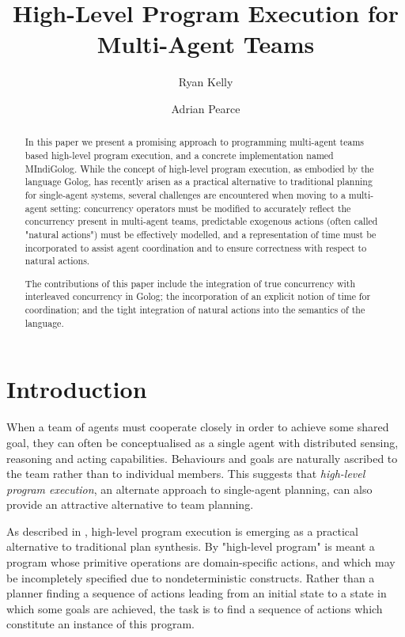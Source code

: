 \documentclass[letterpaper]{article}
\begin{document}
\title{High-Level Program Execution for Multi-Agent Teams}

\author{Ryan Kelly \and Adrian Pearce}

\maketitle

\begin{abstract}
In this paper we present a promising approach to programming multi-agent
teams based high-level program execution, and a concrete implementation
named MIndiGolog. While the concept of high-level program execution,
as embodied by the language Golog, has recently arisen as a practical
alternative to traditional planning for single-agent systems, several
challenges are encountered when moving to a multi-agent setting: concurrency
operators must be modified to accurately reflect the concurrency present
in multi-agent teams, predictable exogenous actions (often called
"natural actions") must be effectively modelled, and a representation
of time must be incorporated to assist agent coordination and to ensure
correctness with respect to natural actions. 

The contributions of this paper include the integration of true concurrency
with interleaved concurrency in Golog; the incorporation of an explicit
notion of time for coordination; and the tight integration of natural
actions into the semantics of the language.
\end{abstract}

\section{Introduction}

When a team of agents must cooperate closely in order to achieve some
shared goal, they can often be conceptualised as a single agent with
distributed sensing, reasoning and acting capabilities. Behaviours
and goals are naturally ascribed to the team rather than to individual
members. This suggests that \emph{high-level program execution}, an
alternate approach to single-agent planning, can also provide an attractive
alternative to team planning.

As described in \cite{giacomo99indigolog}, high-level program execution
is emerging as a practical alternative to traditional plan
synthesis. By "high-level program" is meant a program whose
primitive operations are domain-specific actions, and which may be
incompletely specified due to nondeterministic constructs. Rather
than a planner finding a sequence of actions leading from an initial
state to a state in which some goals are achieved, the task is to
find a sequence of actions which constitute an instance of this program.
\end{document}
